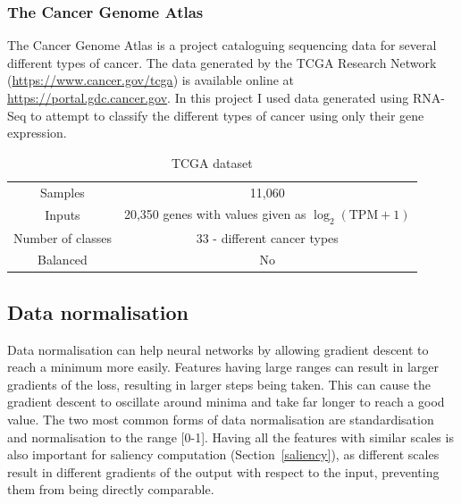 \subsubsection{The Cancer Genome Atlas}
The Cancer Genome Atlas is a project cataloguing sequencing data for several different types of cancer. The data generated by the TCGA Research 
Network (\url{https://www.cancer.gov/tcga}) is available online at \url{https://portal.gdc.cancer.gov}. In this project I used data generated using 
RNA-Seq to attempt to classify the different types of cancer using only their gene expression.
\begin{table}[H]
  \label{tab:tcga_dataset}
  \small %
  \centering %
  \begin{tabular}{cc} %
  \toprule[\heavyrulewidth]
  Samples & 11,060 \\
  Inputs & 20,350 genes with values given as $\log_{2}(\text{TPM}+1)$ \footnotemark \\
  Number of classes & 33 - different cancer types\\
  Balanced & No \\
  \bottomrule[\heavyrulewidth] 
  \end{tabular}
  \caption{TCGA dataset} 
\end{table}

\subsection{Data normalisation} \label{normalise}
Data normalisation can help neural networks by allowing gradient descent to reach a minimum more easily. Features having large ranges
can result in larger gradients of the loss, resulting in larger steps being taken. This can cause the 
gradient descent to oscillate around minima and take far longer to reach a good value. The two most common forms of data normalisation 
are standardisation and normalisation to the range [0-1]. Having all the features with similar scales is also important for saliency computation
(Section~\ref{saliency}),
as different scales result in different gradients of the output with respect to the input, preventing them from being directly comparable.

